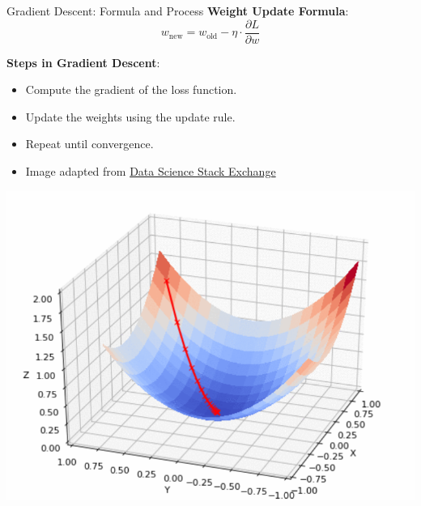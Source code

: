 \documentclass[serif, aspectratio=169]{beamer}
\begin{document}
\begin{frame}{Gradient Descent: Formula and Process}
    \textbf{Weight Update Formula}:
    \[
    w_{\text{new}} = w_{\text{old}} - \eta \cdot \frac{\partial L}{\partial w}
    \]

    \textbf{Steps in Gradient Descent}:
    \begin{itemize}
        \item Compute the gradient of the loss function.
        \item Update the weights using the update rule.
        \item Repeat until convergence.
        \item Image adapted from \href{https://datascience.stackexchange.com/questions/90204/gradient-descent-around-optimal-loss-surface}{Data Science Stack Exchange}
    \end{itemize}
    
    \vspace{-2cm} %
    \begin{flushright}
        \includegraphics[scale=0.3]{pic/GD.png} %
    \end{flushright}
\end{frame}
\end{document}
